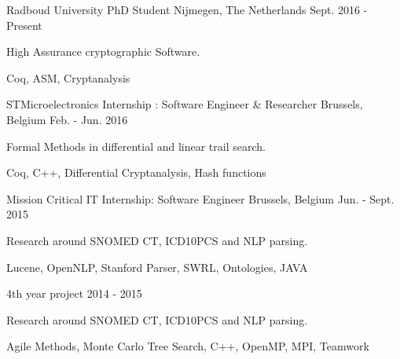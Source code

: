 

\begin{cventries}

  \cventrysix%
    {Radboud University} %
    {PhD Student} %
    {Nijmegen, The Netherlands} %
    {Sept. 2016 - Present} %
    {
      \begin{cvitems} %
        \item {High Assurance cryptographic Software.} %
      \end{cvitems}
    }%
    {Coq, ASM, Cryptanalysis}%

  \cventrysix%
    {STMicroelectronics} %
    {Internship : Software Engineer \& Researcher} %
    {Brussels, Belgium} %
    {Feb. - Jun. 2016} %
    {
      \begin{cvitems} %
        \item {Formal Methods in differential and linear trail search.} %
      \end{cvitems}
    }%
    {Coq, C++, Differential Cryptanalysis, Hash functions}%

  \cventrysix%
    {Mission Critical IT} %
    {Internship: Software Engineer} %
    {Brussels, Belgium} %
    {Jun. - Sept. 2015} %
    {
      \begin{cvitems} %
        \item {Research around SNOMED CT, ICD10PCS and NLP parsing.}
      \end{cvitems}
    }%
    {Lucene, OpenNLP, Stanford Parser, SWRL, Ontologies, JAVA}%

  \cventrysix
    {} %
    {4th year project} %
    {} %
    {2014 - 2015} %
    {
      \begin{cvitems} %
        \item {Research around SNOMED CT, ICD10PCS and NLP parsing.}
      \end{cvitems}
    }%
    {Agile Methods, Monte Carlo Tree Search, C++, OpenMP, MPI, Teamwork}


\end{cventries}
